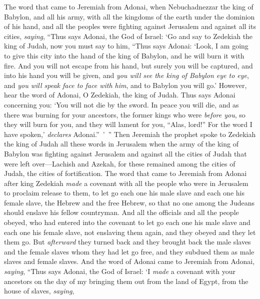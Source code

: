 \begin{biblechapter} %
 The word that came to Jeremiah from Adonai, when Nebuchadnezzar the king of Babylon, and all his army, with all the kingdoms of the earth under the dominion of his hand, and all the peoples were fighting against Jerusalem and against all its cities, \textit{saying},
\verse “Thus says Adonai, the God of Israel: ‘Go and say to Zedekiah the king of Judah, now you must say to him, “Thus says Adonai: ‘Look, I am going to give this city into the hand of the king of Babylon, and he will burn it with fire.
\verse And you will not escape from his hand, but surely you will be captured, and into his hand you will be given, and \textit{you will see the king of Babylon eye to eye}, and \textit{you will speak face to face with him}, and to Babylon you will go.’
\verse However, hear the word of Adonai, O Zedekiah, the king of Judah. Thus says Adonai concerning you: ‘You will not die by the sword.
\verse In peace you will die, and as there was burning for your ancestors, the former kings who were \textit{before you}, so they will burn for you, and they will lament for you, “Alas, lord!” For the word I have spoken,’ \textit{declares} Adonai.” ’ ”
\verse Then Jeremiah the prophet spoke to Zedekiah the king of Judah all these words in Jerusalem
\verse when the army of the king of Babylon was fighting against Jerusalem and against all the cities of Judah that were left over—Lachish and Azekah, for these remained among the cities of Judah, the cities of fortification.
 The word that came to Jeremiah from Adonai after king Zedekiah \textit{made} a covenant with all the people who were in Jerusalem to proclaim release to them,
\verse to let go each one his male slave and each one his female slave, the Hebrew and the free Hebrew, so that no one among the Judeans should enslave his fellow countryman.
\verse And all the officials and all the people obeyed, who had entered into the covenant to let go each one his male slave and each one his female slave, not enslaving them again, and they obeyed and they let them go.
\verse But \textit{afterward} they turned back and they brought back the male slaves and the female slaves whom they had let go free, and they subdued them as male slaves and female slaves.
\verse And the word of Adonai came to Jeremiah from Adonai, \textit{saying},
\verse “Thus says Adonai, the God of Israel: ‘I \textit{made} a covenant with your ancestors on the day of my bringing them out from the land of Egypt, from the house of slaves, \textit{saying},

\end{biblechapter}
